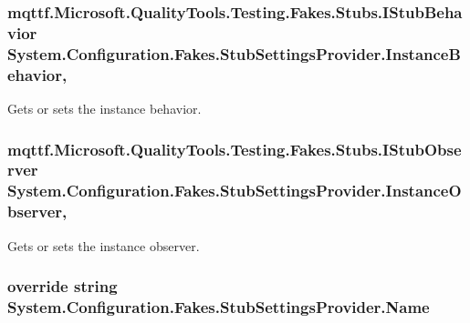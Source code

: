 \hypertarget{class_system_1_1_configuration_1_1_fakes_1_1_stub_settings_provider_a505663404bffe2482c7459814722bd59}{
\subsubsection[{Instance\-Behavior}]{\setlength{\rightskip}{0pt plus 5cm}mqttf.\-Microsoft.\-Quality\-Tools.\-Testing.\-Fakes.\-Stubs.\-I\-Stub\-Behavior System.\-Configuration.\-Fakes.\-Stub\-Settings\-Provider.\-Instance\-Behavior\hspace{0.3cm}{\ttfamily [get]}, {\ttfamily [set]}}}\label{class_system_1_1_configuration_1_1_fakes_1_1_stub_settings_provider_a505663404bffe2482c7459814722bd59}


Gets or sets the instance behavior.

\hypertarget{class_system_1_1_configuration_1_1_fakes_1_1_stub_settings_provider_afe4074ec4560afad39504223e8d627d8}{
\subsubsection[{Instance\-Observer}]{\setlength{\rightskip}{0pt plus 5cm}mqttf.\-Microsoft.\-Quality\-Tools.\-Testing.\-Fakes.\-Stubs.\-I\-Stub\-Observer System.\-Configuration.\-Fakes.\-Stub\-Settings\-Provider.\-Instance\-Observer\hspace{0.3cm}{\ttfamily [get]}, {\ttfamily [set]}}}\label{class_system_1_1_configuration_1_1_fakes_1_1_stub_settings_provider_afe4074ec4560afad39504223e8d627d8}


Gets or sets the instance observer.

\hypertarget{class_system_1_1_configuration_1_1_fakes_1_1_stub_settings_provider_abac3f4327739c2b9677cbfa34c1df243}{
\subsubsection[{Name}]{\setlength{\rightskip}{0pt plus 5cm}override string System.\-Configuration.\-Fakes.\-Stub\-Settings\-Provider.\-Name\hspace{0.3cm}{\ttfamily [get]}}}\label{class_system_1_1_configuration_1_1_fakes_1_1_stub_settings_provider_abac3f4327739c2b9677cbfa34c1df243}


